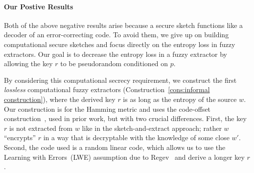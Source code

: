 \documentclass[11pt]{article}
\newcommand{\consref}[1]{\mbox{Construction~\ref{#1}}}
\newcommand{\class}[1]{{\ensuremath{\mathsf{#1}}}}
\newcommand{\rep}{\ensuremath{\class{Rep}}\xspace}
\newcommand{\rec}{\ensuremath{\class{Rec}}\xspace}
\newcommand{\authnote}[2]{{\textcolor{red}{\textsf{#1 notes: }\textcolor{blue}{ #2}}\marginpar{\textcolor{red}{\textbf{!!!!!}}}}}
\newcommand{\authnote}[2]{}
\newcommand{\lnote}[1]{{\authnote{Leo}{#1}}}
\newcommand{\recout}{x}
\begin{document}





\paragraph {Our Postive Results}

Both of the above negative results arise because a secure sketch functions like a decoder of an error-correcting code.  To avoid them, we give up on building computational secure sketches and focus directly on the entropy loss in fuzzy extractors.  Our goal is to decrease the entropy loss in a fuzzy extractor by allowing the key $r$ to be pseudorandom conditioned on $p$.  

By considering this computational secrecy requirement, we construct the first \emph{lossless} computational fuzzy extractors (\consref{cons:informal construction}), where the derived key $r$ is as long as the entropy of the source $w$. Our construction is for the Hamming metric and uses the code-offset construction~\cite{JW99},\cite[Section 5]{DBLP:journals/siamcomp/DodisORS08} used in prior work, but with two crucial differences.  First, the key $r$ is not extracted from $w$ like in the sketch-and-extract approach; rather $w$ ``encrypts'' $r$ in a way that is decryptable with the knowledge of some close $w'$. Second, the code used is a random linear code, which allows us to use the Learning with Errors~(LWE) assumption due to Regev~\cite{regev2005LWE, regevLWEsurvey} and derive a longer key $r$.
\end{document}
